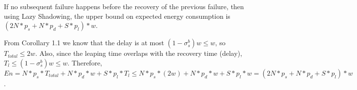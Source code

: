 \begin{theorem}
If no subsequent failure happens before the recovery of the previous failure, then using Lazy Shadowing, the upper bound on expected energy consumption is
$(2N * p_s + N * p_d + S * p_{l})*w$.
\end{theorem}
\begin{IEEEproof}
From Corollary 1.1 we know that the delay is at most $(1-\sigma_s^b)w \le w$, so $T_{total} \le 2w$. Also, since the leaping time overlaps with the recovery time (delay), $T_l \le (1-\sigma_s^b)w \le w$. Therefore, $En = N * p_s * T_{total} + N * p_d * w + S * p_{l} * T_l \le N * p_s * (2w) + N * p_d * w + S * p_{l} * w = (2N * p_s + N * p_d + S * p_{l})*w$.
\end{IEEEproof}
